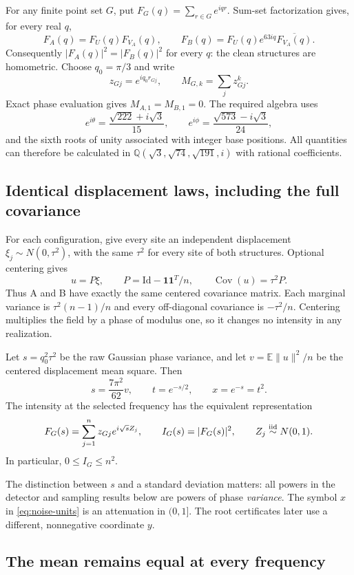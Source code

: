 \documentclass[11pt]{article}
\newcommand{\E}{\mathbb E}
\newcommand{\one}{\mathbf1}
\begin{document}
For any finite point set $G$, put $F_G(q)=\sum_{r\in G}e^{iqr}$. Sum-set
factorization gives, for every real $q$,
\[
 F_A(q)=F_U(q)F_{V_A}(q),\qquad
 F_B(q)=F_U(q)e^{63iq}\overline{F_{V_A}(q)}.
\]
Consequently $|F_A(q)|^2=|F_B(q)|^2$ for every $q$: the clean structures are
homometric. Choose $q_0=\pi/3$ and write
\[
 z_{Gj}=e^{iq_0r_{Gj}},\qquad M_{G,k}=\sum_j z_{Gj}^k.
\]
Exact phase evaluation gives $M_{A,1}=M_{B,1}=0$. The required algebra uses
\[
 e^{i\theta}=\frac{\sqrt{222}+i\sqrt3}{15},\qquad
 e^{i\phi}=\frac{\sqrt{573}-i\sqrt3}{24},
\]
and the sixth roots of unity associated with integer base positions.
All quantities can therefore be calculated in
$\mathbb Q(\sqrt3,\sqrt{74},\sqrt{191},i)$ with rational coefficients.

\subsection{Identical displacement laws, including the full covariance}

For each configuration, give every site an independent displacement
$\xi_j\sim N(0,\tau^2)$, with the same $\tau^2$ for every site of both
structures. Optional centering gives
\[
 u=P\xi,\qquad P=\mathrm{Id}-\one\one^T/n,\qquad
 \operatorname{Cov}(u)=\tau^2P.
\]
Thus A and B have exactly the same centered covariance matrix. Each marginal
variance is $\tau^2(n-1)/n$ and every off-diagonal covariance is $-\tau^2/n$.
Centering multiplies the field by a phase of modulus one, so it changes no
intensity in any realization.

Let $s=q_0^2\tau^2$ be the raw Gaussian phase variance, and let
$v=\E\|u\|^2/n$ be the centered displacement mean square. Then
\begin{equation}\label{eq:noise-units}
 s=\frac{7\pi^2}{62}v,\qquad
 t=e^{-s/2},\qquad x=e^{-s}=t^2.
\end{equation}
The intensity at the selected frequency has the equivalent representation
\[
 F_G(s)=\sum_{j=1}^n z_{Gj}e^{i\sqrt{s}Z_j},\qquad
 I_G(s)=|F_G(s)|^2,\qquad Z_j\stackrel{\rm iid}{\sim}N(0,1).
\]
In particular, $0\le I_G\le n^2$.

The distinction between $s$ and a standard deviation matters: all powers in
the detector and sampling results below are powers of phase \emph{variance}.
The symbol $x$ in \eqref{eq:noise-units} is an attenuation in $(0,1]$.
The root certificates later use a different, nonnegative coordinate $y$.

\subsection{The mean remains equal at every frequency}
\end{document}
